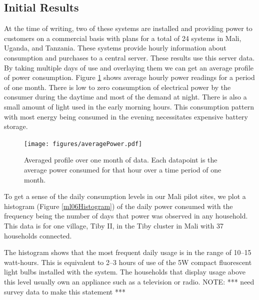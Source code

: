 \documentclass[conference]{IEEEtran}
\newcommand{\note}[1]{{\color{red} NOTE: *** #1 ***}}
\begin{document}


\subsection{Initial Results}
At the time of writing, two of these systems are installed and providing
power to customers on a commercial basis with plans for a total of 
24 systems in Mali, Uganda, and Tanzania.
These systems provide hourly information about consumption and purchases
to a central server.
These results use this server data.
By taking multiple days of use and overlaying them we can get an average
profile of power consumption.
Figure \ref{averagedAccumulatedEnergy} shows average hourly power readings 
for a period of one month.
There is low to zero consumption of electrical power by the consumer during the 
daytime and most of the demand at night.   
There is also a small amount of light used in the early morning hours.
This consumption pattern with most energy being consumed in the evening
necessitates expensive battery storage. 

\begin{figure}[]
\begin{center}
\texttt{[image: figures/averagePower.pdf]}
\end{center}
\caption{Averaged profile over one month of data.  Each datapoint is the
average power consumed for that hour over a time period of one month.}
\label{averagedAccumulatedEnergy}
\end{figure}

To get a sense of the daily consumption levels in our Mali pilot sites,
we plot a histogram (Figure \ref{ml06Histogram}) of the daily 
power consumed with the frequency being 
the number of days that power was observed in any household.  
This data is for one village, Tiby II, in the Tiby cluster in Mali with
37 households connected.

The histogram shows that the most frequent
daily usage is in the range of 10--15 watt-hours.  
This is equivalent to 2--3 hours of use of the 5W compact fluorescent 
light bulbs installed with the system.  
The households that display usage above this level usually own an appliance 
such as a television or radio.
\note{need survey data to make this statement}
\end{document}

